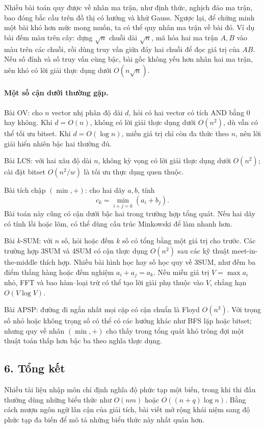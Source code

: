 \documentclass[11pt]{article}
\begin{document}
Nhiều bài toán quy được về nhân ma trận, như định thức, nghịch đảo ma trận,
bao đóng bắc cầu trên đồ thị có hướng và khử Gauss. Ngược lại, để chứng minh
một bài khó hơn mức mong muốn, ta có thể quy nhân ma trận về bài đó. Ví dụ bài
đếm màu trên cây: dựng \(\sqrt n\) chuỗi dài \(\sqrt n\), mã hóa hai ma trận
\(A,B\) vào màu trên các chuỗi, rồi dùng truy vấn giữa đáy hai chuỗi để đọc
giá trị của \(AB\). Nếu số đỉnh và số truy vấn cùng bậc, bài gốc không yếu hơn
nhân hai ma trận, nên khó có lời giải thực dụng dưới \(O(n\sqrt n)\).

\paragraph{Một số cận dưới thường gặp.}
Bài OV: cho \(n\) vector nhị phân độ dài \(d\), hỏi có hai vector có tích AND
bằng 0 hay không. Khi \(d=O(n)\), không có lời giải thực dụng dưới \(O(n^2)\),
dù vẫn có thể tối ưu bitset. Khi \(d=O(\log n)\), miền giá trị chỉ còn
đa thức theo \(n\), nên lời giải hiển nhiên bậc hai thường đủ.

Bài LCS: với hai xâu độ dài \(n\), không kỳ vọng có lời giải thực dụng dưới
\(O(n^2)\); cài đặt bitset \(O(n^2/w)\) là tối ưu thực dụng quen thuộc.

Bài tích chập \((\min,+)\): cho hai dãy \(a,b\), tính
\[
  c_k=\min_{i+j=k}(a_i+b_j).
\]
Bài toán này cũng có cận dưới bậc hai trong trường hợp tổng quát. Nếu hai dãy
có tính lồi hoặc lõm, có thể dùng cấu trúc Minkowski để làm nhanh hơn.

Bài \(k\)-SUM: với \(n\) số, hỏi hoặc đếm \(k\) số có tổng bằng một giá trị cho
trước. Các trường hợp 3SUM và 4SUM có cận thực dụng \(O(n^2)\) sau các kỹ thuật
meet-in-the-middle thích hợp. Nhiều bài hình học hay số học quy về 3SUM, như
đếm ba điểm thẳng hàng hoặc đếm nghiệm \(a_i+a_j=a_k\). Nếu miền giá trị
\(V=\max a_i\) nhỏ, FFT và bao hàm--loại trừ có thể tạo lời giải phụ thuộc vào
\(V\), chẳng hạn \(O(V\log V)\).

Bài APSP: đường đi ngắn nhất mọi cặp có cận chuẩn là Floyd \(O(n^3)\). Với
trọng số nhỏ hoặc không trọng số có thể có các hướng khác như BFS lặp hoặc
bitset; nhưng quy về nhân \((\min,+)\) cho thấy trong tổng quát khó trông đợi
một thuật toán thấp hơn bậc ba theo nghĩa thực dụng.

\subsection*{6. Tổng kết}

Nhiều tài liệu nhập môn chỉ định nghĩa độ phức tạp một biến, trong khi thi đấu
thường dùng những biểu thức như \(O(nm)\) hoặc \(O((n+q)\log n)\). Bằng cách
mượn ngôn ngữ lân cận của giải tích, bài viết mở rộng khái niệm sang độ phức
tạp đa biến để mô tả những biểu thức này nhất quán hơn.
\end{document}
